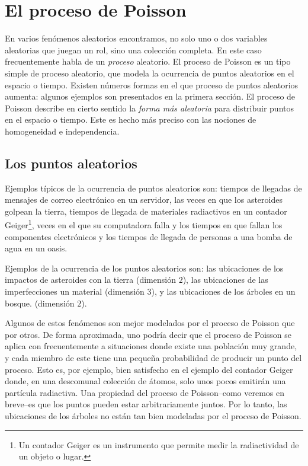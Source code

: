 \section{El proceso de Poisson}
\label{sec:12}

En varios fenómenos aleatorios encontramos, no solo uno o dos variables aleatorias que juegan un rol, sino una colección completa. En este caso frecuentemente habla de un \textit{proceso} aleatorio. El proceso de Poisson es un tipo simple de proceso aleatorio, que modela la ocurrencia de puntos aleatorios en el espacio o tiempo. Existen números formas en el que proceso de puntos aleatorios aumenta: algunos ejemplos son presentados en la primera sección. El proceso de Poisson describe en cierto sentido la \textit{forma más aleatoria} para distribuir puntos en el espacio o tiempo. Este es hecho más preciso con las nociones de homogeneidad e independencia.

\subsection{Los puntos aleatorios}

Ejemplos típicos de la ocurrencia de puntos aleatorios son: tiempos de llegadas de mensajes de correo electrónico en un servidor, las veces en que los asteroides golpean la tierra, tiempos de llegada de materiales radiactivos en un contador Geiger\footnote{Un contador Geiger es un instrumento que permite medir la radiactividad de un objeto o lugar.}, veces en el que su computadora falla y los tiempos en que fallan los componentes electrónicos y los tiempos de llegada de personas a una bomba de agua en un oasis.

Ejemplos de la ocurrencia de los puntos aleatorios son: las ubicaciones de los impactos de asteroides con la tierra (dimensión $2$), las ubicaciones de las imperfecciones un material (dimensión $3$), y las ubicaciones de los árboles en un bosque. (dimensión $2$).

Algunos de estos fenómenos son mejor modelados por el proceso de Poisson que por otros. De forma aproximada, uno podría decir que el proceso de Poisson se aplica con frecuentemente a situaciones donde existe una población muy grande, y cada miembro de este tiene una pequeña probabilidad de producir un punto del proceso. Esto es, por ejemplo, bien satisfecho en el ejemplo del contador Geiger donde, en una descomunal colección de átomos, solo unos pocos emitirán una partícula radiactiva. Una propiedad del proceso de Poisson--como veremos en breve--es que los puntos pueden estar arbitrariamente juntos. Por lo tanto, las ubicaciones de los árboles no están tan bien modeladas por el proceso de Poisson.


